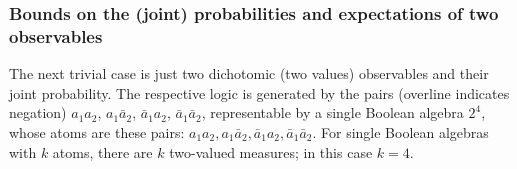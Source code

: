 \documentclass[%
  twocolumn,
 showpacs,
 showkeys,
 preprintnumbers,
 amsmath,amssymb,
 aps,
  pra,
  longbibliography,
 floatfix,
 ]{revtex4-1}
\begin{document}


\subsubsection{Bounds on the (joint) probabilities and expectations of two observables}

The next trivial case is just two dichotomic (two values) observables and their joint probability.
The respective logic is generated by the pairs   (overline indicates negation)
$a_1a_2$,
$a_1\bar{a}_2$,
$\bar{a}_1a_2$,
$\bar{a}_1\bar{a}_2$,
representable by a single Boolean algebra $2^4$, whose atoms are these pairs:
$a_1a_2,a_1\bar{a}_2,\bar{a}_1a_2,\bar{a}_1\bar{a}_2$.
For single Boolean algebras with $k$ atoms, there are $k$ two-valued measures; in this case $k=4$.
\end{document}
